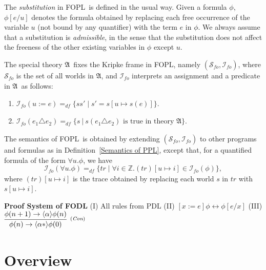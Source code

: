 \documentclass[manuscript,screen]{acmart}
\newcommand{\mbb}[1]{\mathbb{#1}}
\newcommand{\mcl}[1]{\mathcal{#1}}
\newcommand{\la}[0]{\langle}
\newcommand{\ra}[0]{\rangle}
\newcommand{\mfr}[1]{\mathfrak{#1}}
\newcommand{\dddef}[0]{=_{df}}
\newcommand{\PDL}[0]{\mbox{PDL}}
\newcommand{\Wd}[0]{\mcl{S}}
\newcommand{\I}[0]{\mcl{I}}
\newcommand{\Arith}[0]{\mbox{$\mfr{A}$}}
\newcommand{\fo}[0]{{\textit{fo}}}
\newcommand{\FOPL}[0]{\mbox{FOPL}}
\newcommand{\FODL}[0]{\mbox{FODL}}
\begin{document}
The \emph{substitution} in \FOPL\ is defined in the usual way. 
Given a formula $\phi$, $\phi[e/u]$ denotes the formula obtained by replacing each free occurrence of the variable $u$ (not bound by any quantifier) with the term $e$ in $\phi$. 
We always assume that a substitution is \emph{admissible}, in the sense that the substitution does not affect the freeness of the other existing variables in $\phi$ except $u$. 


The special theory \Arith\ fixes the Kripke frame in \FOPL, namely $(\Wd_{\fo}, \I_{\fo})$, where $\Wd_{\fo}$ is the set of all worlds in $\Arith$, and $\I_\fo$ interprets an assignment and a predicate in \Arith\ as follows:
\begin{enumerate}
\item $\I_\fo(u := e) \dddef \{ss' \mid s' = s[u\mapsto s(e)]\}$. 
\item $\I_\fo(e_1\triangle e_2) \dddef \{s \ |\ s(e_1\triangle e_2)\mbox{ is true in theory $\Arith$}\}$. 
\end{enumerate} 
The semantics of \FOPL\ is obtained by extending $(\Wd_\fo, \I_\fo)$ to other programs and formulas as in Definition~\ref{Semantics of PPL}, except that, for a quantified formula of the form $\forall u.\phi$, we have 
$$
\I_\fo(\forall u.\phi) \dddef \{tr \mid \forall i\in \mbb{Z}. (tr)[u\mapsto i]\in \I_\fo(\phi)\}, 
$$
where $(tr)[u\mapsto i]$ is the trace obtained by replacing each world $s$ in $tr$ with $s[u\mapsto i]$. 

\ifx
\textbf{Proof System of \FODL}
(I) All rules from \PDL
(II) $[x:=e]\phi\leftrightarrow \phi[e/x]$
(III)
$
\begin{aligned}
    \infer[^{(\textit{Con})}]
    {\phi(n)\to \la\alpha*\ra\phi(0)}
    {\phi(n+1)\to\la\alpha\ra\phi(n)}
\end{aligned}
$

\fi






\section{Overview}
\label{section:Overview}
\end{document}
